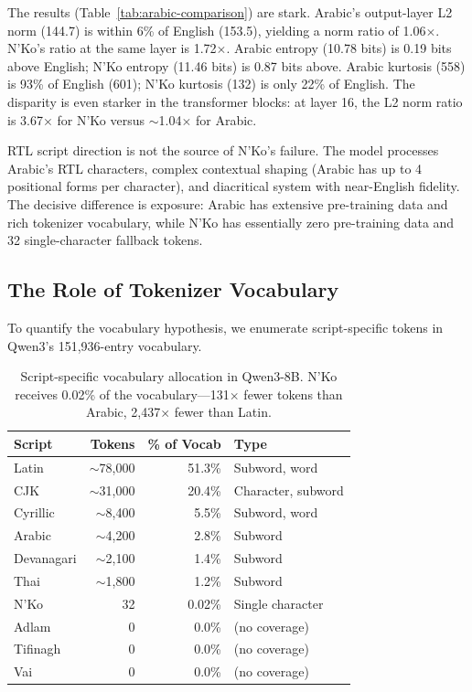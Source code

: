 \documentclass[11pt]{article}
\begin{document}
The results (Table~\ref{tab:arabic-comparison}) are stark.
Arabic's output-layer L2 norm (144.7) is within 6\% of English (153.5), yielding a norm ratio of 1.06$\times$.
N'Ko's ratio at the same layer is 1.72$\times$.
Arabic entropy (10.78 bits) is 0.19 bits above English; N'Ko entropy (11.46 bits) is 0.87 bits above.
Arabic kurtosis (558) is 93\% of English (601); N'Ko kurtosis (132) is only 22\% of English.
The disparity is even starker in the transformer blocks: at layer 16, the L2 norm ratio is 3.67$\times$ for N'Ko versus $\sim$1.04$\times$ for Arabic.

RTL script direction is not the source of N'Ko's failure.
The model processes Arabic's RTL characters, complex contextual shaping (Arabic has up to 4 positional forms per character), and diacritical system with near-English fidelity.
The decisive difference is exposure: Arabic has extensive pre-training data and rich tokenizer vocabulary, while N'Ko has essentially zero pre-training data and 32 single-character fallback tokens.

\subsection{The Role of Tokenizer Vocabulary}

To quantify the vocabulary hypothesis, we enumerate script-specific tokens in Qwen3's 151,936-entry vocabulary.

\begin{table}[t]
\centering
\small
\begin{tabular}{lrrl}
\toprule
\textbf{Script} & \textbf{Tokens} & \textbf{\% of Vocab} & \textbf{Type} \\
\midrule
Latin & ${\sim}$78,000 & 51.3\% & Subword, word \\
CJK & ${\sim}$31,000 & 20.4\% & Character, subword \\
Cyrillic & ${\sim}$8,400 & 5.5\% & Subword, word \\
Arabic & ${\sim}$4,200 & 2.8\% & Subword \\
Devanagari & ${\sim}$2,100 & 1.4\% & Subword \\
Thai & ${\sim}$1,800 & 1.2\% & Subword \\
\midrule
N'Ko & 32 & 0.02\% & Single character \\
Adlam & 0 & 0.0\% & (no coverage) \\
Tifinagh & 0 & 0.0\% & (no coverage) \\
Vai & 0 & 0.0\% & (no coverage) \\
\bottomrule
\end{tabular}
\caption{Script-specific vocabulary allocation in Qwen3-8B. N'Ko receives 0.02\% of the vocabulary---131$\times$ fewer tokens than Arabic, 2,437$\times$ fewer than Latin.}
\label{tab:vocab-allocation}
\end{table}
\end{document}
